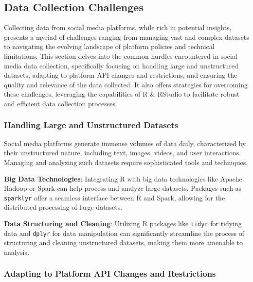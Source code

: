 \documentclass[
]{book}
\begin{document}
\hypertarget{data-collection-challenges}{%
\subsection*{Data Collection Challenges}\label{data-collection-challenges}}

Collecting data from social media platforms, while rich in potential insights, presents a myriad of challenges ranging from managing vast and complex datasets to navigating the evolving landscape of platform policies and technical limitations. This section delves into the common hurdles encountered in social media data collection, specifically focusing on handling large and unstructured datasets, adapting to platform API changes and restrictions, and ensuring the quality and relevance of the data collected. It also offers strategies for overcoming these challenges, leveraging the capabilities of R \& RStudio to facilitate robust and efficient data collection processes.

\hypertarget{handling-large-and-unstructured-datasets}{%
\subsubsection*{Handling Large and Unstructured Datasets}\label{handling-large-and-unstructured-datasets}}

Social media platforms generate immense volumes of data daily, characterized by their unstructured nature, including text, images, videos, and user interactions. Managing and analyzing such datasets require sophisticated tools and techniques.

\textbf{Big Data Technologies}: Integrating R with big data technologies like Apache Hadoop or Spark can help process and analyze large datasets. Packages such as \texttt{sparklyr} offer a seamless interface between R and Spark, allowing for the distributed processing of large datasets.

\textbf{Data Structuring and Cleaning}: Utilizing R packages like \texttt{tidyr} for tidying data and \texttt{dplyr} for data manipulation can significantly streamline the process of structuring and cleaning unstructured datasets, making them more amenable to analysis.

\hypertarget{adapting-to-platform-api-changes-and-restrictions}{%
\subsubsection*{Adapting to Platform API Changes and Restrictions}\label{adapting-to-platform-api-changes-and-restrictions}}
\end{document}
